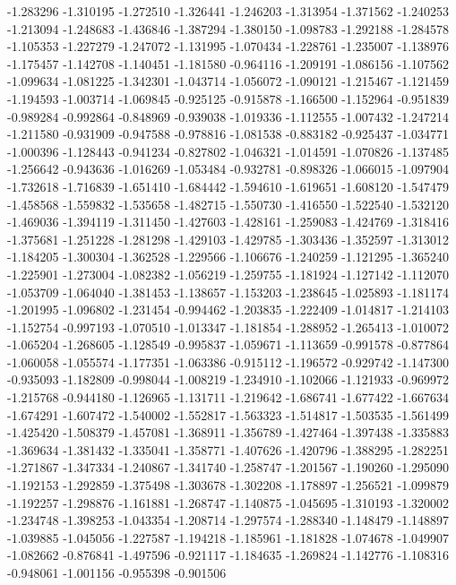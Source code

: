 -1.283296
-1.310195
-1.272510
-1.326441
-1.246203
-1.313954
-1.371562
-1.240253
-1.213094
-1.248683
-1.436846
-1.387294
-1.380150
-1.098783
-1.292188
-1.284578
-1.105353
-1.227279
-1.247072
-1.131995
-1.070434
-1.228761
-1.235007
-1.138976
-1.175457
-1.142708
-1.140451
-1.181580
-0.964116
-1.209191
-1.086156
-1.107562
-1.099634
-1.081225
-1.342301
-1.043714
-1.056072
-1.090121
-1.215467
-1.121459
-1.194593
-1.003714
-1.069845
-0.925125
-0.915878
-1.166500
-1.152964
-0.951839
-0.989284
-0.992864
-0.848969
-0.939038
-1.019336
-1.112555
-1.007432
-1.247214
-1.211580
-0.931909
-0.947588
-0.978816
-1.081538
-0.883182
-0.925437
-1.034771
-1.000396
-1.128443
-0.941234
-0.827802
-1.046321
-1.014591
-1.070826
-1.137485
-1.256642
-0.943636
-1.016269
-1.053484
-0.932781
-0.898326
-1.066015
-1.097904
-1.732618
-1.716839
-1.651410
-1.684442
-1.594610
-1.619651
-1.608120
-1.547479
-1.458568
-1.559832
-1.535658
-1.482715
-1.550730
-1.416550
-1.522540
-1.532120
-1.469036
-1.394119
-1.311450
-1.427603
-1.428161
-1.259083
-1.424769
-1.318416
-1.375681
-1.251228
-1.281298
-1.429103
-1.429785
-1.303436
-1.352597
-1.313012
-1.184205
-1.300304
-1.362528
-1.229566
-1.106676
-1.240259
-1.121295
-1.365240
-1.225901
-1.273004
-1.082382
-1.056219
-1.259755
-1.181924
-1.127142
-1.112070
-1.053709
-1.064040
-1.381453
-1.138657
-1.153203
-1.238645
-1.025893
-1.181174
-1.201995
-1.096802
-1.231454
-0.994462
-1.203835
-1.222409
-1.014817
-1.214103
-1.152754
-0.997193
-1.070510
-1.013347
-1.181854
-1.288952
-1.265413
-1.010072
-1.065204
-1.268605
-1.128549
-0.995837
-1.059671
-1.113659
-0.991578
-0.877864
-1.060058
-1.055574
-1.177351
-1.063386
-0.915112
-1.196572
-0.929742
-1.147300
-0.935093
-1.182809
-0.998044
-1.008219
-1.234910
-1.102066
-1.121933
-0.969972
-1.215768
-0.944180
-1.126965
-1.131711
-1.219642
-1.686741
-1.677422
-1.667634
-1.674291
-1.607472
-1.540002
-1.552817
-1.563323
-1.514817
-1.503535
-1.561499
-1.425420
-1.508379
-1.457081
-1.368911
-1.356789
-1.427464
-1.397438
-1.335883
-1.369634
-1.381432
-1.335041
-1.358771
-1.407626
-1.420796
-1.388295
-1.282251
-1.271867
-1.347334
-1.240867
-1.341740
-1.258747
-1.201567
-1.190260
-1.295090
-1.192153
-1.292859
-1.375498
-1.303678
-1.302208
-1.178897
-1.256521
-1.099879
-1.192257
-1.298876
-1.161881
-1.268747
-1.140875
-1.045695
-1.310193
-1.320002
-1.234748
-1.398253
-1.043354
-1.208714
-1.297574
-1.288340
-1.148479
-1.148897
-1.039885
-1.045056
-1.227587
-1.194218
-1.185961
-1.181828
-1.074678
-1.049907
-1.082662
-0.876841
-1.497596
-0.921117
-1.184635
-1.269824
-1.142776
-1.108316
-0.948061
-1.001156
-0.955398
-0.901506
